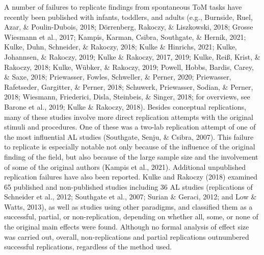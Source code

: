 \documentclass[
  man,floatsintext]{apa6}
\begin{document}
A number of failures to replicate findings from spontaneous ToM tasks have recently been published with infants, toddlers, and adults (e.g., Burnside, Ruel, Azar, \& Poulin-Dubois, 2018; Dörrenberg, Rakoczy, \& Liszkowski, 2018; Grosse Wiesmann et al., 2017; Kampis, Karman, Csibra, Southgate, \& Hernik, 2021; Kulke, Duhn, Schneider, \& Rakoczy, 2018; Kulke \& Hinrichs, 2021; Kulke, Johannsen, \& Rakoczy, 2019; Kulke \& Rakoczy, 2017, 2019; Kulke, Reiß, Krist, \& Rakoczy, 2018; Kulke, Wübker, \& Rakoczy, 2019; Powell, Hobbs, Bardis, Carey, \& Saxe, 2018; Priewasser, Fowles, Schweller, \& Perner, 2020; Priewasser, Rafetseder, Gargitter, \& Perner, 2018; Schuwerk, Priewasser, Sodian, \& Perner, 2018; Wiesmann, Friederici, Disla, Steinbeis, \& Singer, 2018; for overviews, see Barone et al., 2019; Kulke \& Rakoczy, 2018). Besides conceptual replications, many of these studies involve more direct replication attempts with the original stimuli and procedures. One of these was a two-lab replication attempt of one of the most influential AL studies (Southgate, Senju, \& Csibra, 2007). This failure to replicate is especially notable not only because of the influence of the original finding of the field, but also because of the large sample size and the involvement of some of the original authors (Kampis et al., 2021). Additional unpublished replication failures have also been reported. Kulke and Rakoczy (2018) examined 65 published and non-published studies including 36 AL studies (replications of Schneider et al., 2012; Southgate et al., 2007; Surian \& Geraci, 2012; and Low \& Watts, 2013), as well as studies using other paradigms, and classified them as a successful, partial, or non-replication, depending on whether all, some, or none of the original main effects were found. Although no formal analysis of effect size was carried out, overall, non-replications and partial replications outnumbered successful replications, regardless of the method used.
\end{document}
